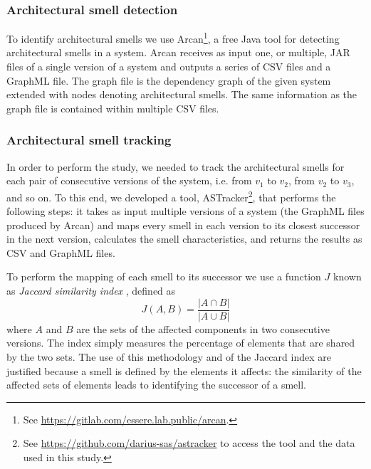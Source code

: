 \subsubsection{Architectural smell detection}
To identify architectural smells we use Arcan\footnote{\label{fn:arcan}See \url{https://gitlab.com/essere.lab.public/arcan}.}, a free Java tool for detecting architectural smells in a system.
Arcan receives as input one, or multiple, JAR files of a single version of a system and outputs a series of CSV files and a GraphML file. The graph file is the dependency graph of the given system extended with nodes denoting architectural smells. The same information as the graph file is contained within multiple CSV files.

\subsubsection{Architectural smell tracking}
In order to perform the study, we needed to track the architectural smells for each pair of consecutive versions of the system, i.e. from $v_1$ to $v_2$, from $v_2$ to $v_3$, and so on.
To this end, we developed a tool, ASTracker\footnote{\label{fn:astracker}See \url{https://github.com/darius-sas/astracker} to access the tool and the data used in this study.}, that performs the following steps: it takes as input multiple versions of a system (the GraphML files produced by Arcan) and maps every smell in each version to its closest successor in the next version, calculates the smell characteristics, and returns the results as CSV and GraphML files.

To perform the mapping of each smell to its successor we use a function $J$ known as \emph{Jaccard similarity index} \cite{Jaccard1912}, defined as
$$J(A, B) = \frac{|A \cap B|}{|A \cup B|}$$
where $A$ and $B$ are the sets of the affected components in two consecutive versions.
The index simply measures the percentage of elements that are shared by the two sets.
The use of this methodology and of the Jaccard index are justified because a smell is defined by the elements it affects: the similarity of the affected sets of elements leads to identifying the successor of a smell.

